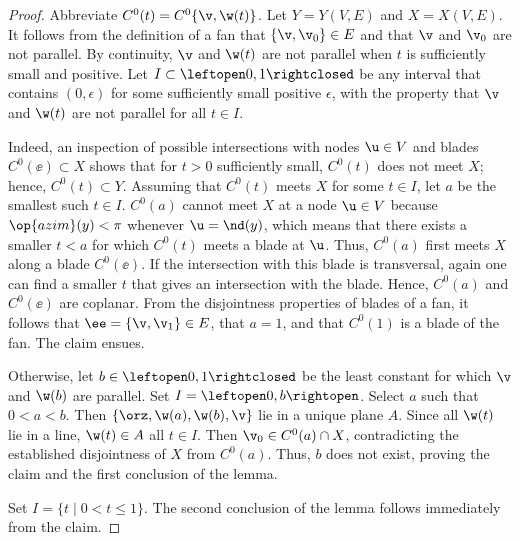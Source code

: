 \begin{proof}
Abbreviate $C^0(t) = C^0\{\v,\w(t)\}$.
Let $Y = Y(V,E)$ and $X = X(V,E)$.
It follows from the definition of a fan that $\{\v,\v_0\}\in E$ and
that $\v$ and $\v_0$ are not parallel.  By continuity, $\v$ and $\w(t)$
are not parallel when $t$ is sufficiently small and positive.  
Let $I\subset\leftopen0,1\rightclosed$ be any interval that contains
$(0,\epsilon)$ for some sufficiently small positive $\epsilon$, with the
property that $\v$ and $\w(t)$ are not parallel for all $t\in I$.

  Indeed, an inspection of possible
intersections with nodes $\u\in V$ and blades $C^0(\ee)\subset X$
shows that for $t>0$ sufficiently small, $C^0(t)$ does not meet $X$;
hence, $C^0(t)\subset Y$.  Assuming that $C^0(t)$ meets $X$ for some
$t\in I$, let $a$ be the smallest such $t\in I$.  $C^0(a)$ cannot meet
$X$ at a node $\u\in V$ because $\op{azim}(y)<\pi$ whenever
$\u=\nd(y)$, which means that
there exists a smaller $t<a$ for which $C^0(t)$ meets a blade at $\u$.
Thus, $C^0(a)$ first meets $X$ along a blade $C^0(\ee)$. If the
intersection with this blade is transversal, again one can find a
smaller $t$ that gives an intersection with the blade.  Hence,
$C^0(a)$ and $C^0(\ee)$ are coplanar.  From the disjointness
properties of blades of a fan, it follows that $\ee = \{\v,\v_1\}\in
E$, that $a=1$, and that $C^0(1)$ is a blade of the fan.  The claim
ensues.

  Otherwise, let $b\in
\leftopen0,1\rightclosed$ be the least constant for which $\v$ and
$\w(b)$ are parallel.  Set  $I=\leftopen0,b\rightopen$.  
Select $a$ such that $0<a<b$.  Then $\{\orz,\w(a),\w(b),\v\}$ lie in a unique plane
$A$.  Since all $\w(t)$ lie in a line, $\w(t)\in A$ all $t\in I$.
Then $\v_0\in C^0(a)\cap X$, contradicting the established
disjointness of $X$ from $C^0(a)$.  Thus, $b$ does not exist, proving
 the claim and the first conclusion of the lemma.

Set $I= \{t\mid 0 < t \le 1\}$.  The second conclusion of the lemma
follows immediately from the claim.
\end{proof}


